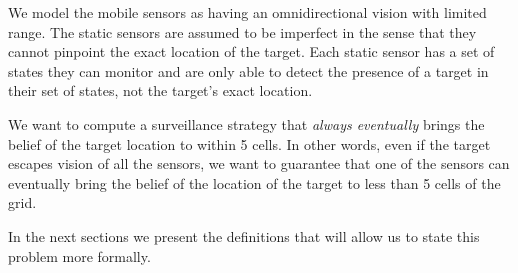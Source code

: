 We model the mobile sensors as having an omnidirectional vision with limited range. 
The static sensors are assumed to be imperfect in the sense that they cannot pinpoint the exact location of the target. Each static sensor has a set of states they can monitor and are only able to detect the presence of a target in their set of states, not the target's exact location. 

We want to compute a surveillance strategy that \emph{always eventually} brings the belief of the target location to within 5 cells. In other words, even if the target escapes vision of all the sensors, we want to guarantee that one of the sensors can eventually bring the belief of the location of the target to less than 5 cells of the grid. 

In the next sections we present the definitions that will allow us to state this problem more formally.